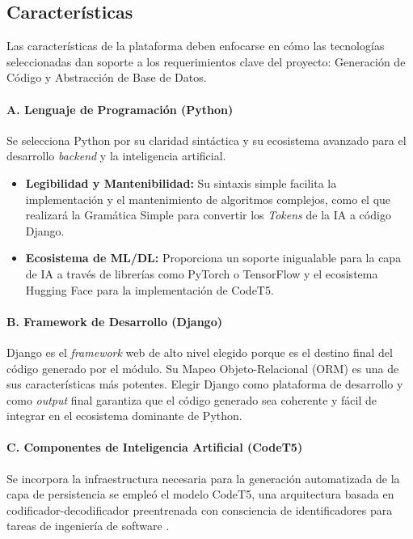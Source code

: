 \subsection{Características}
\label{subsubsec:plataforma-caracteristicas}

Las características de la plataforma deben enfocarse en cómo las tecnologías seleccionadas dan soporte a los requerimientos clave del proyecto: Generación de Código y Abstracción de Base de Datos.

\paragraph{A. Lenguaje de Programación (Python)}
Se selecciona Python por su claridad sintáctica y su ecosistema avanzado para el desarrollo \textit{backend} y la inteligencia artificial.

\begin{itemize}
    \item \textbf{Legibilidad y Mantenibilidad:} Su sintaxis simple facilita la implementación y el mantenimiento de algoritmos complejos, como el que realizará la Gramática Simple para convertir los \textit{Tokens} de la IA a código Django.
    \item \textbf{Ecosistema de ML/DL:} Proporciona un soporte inigualable para la capa de IA a través de librerías como PyTorch o TensorFlow y el ecosistema Hugging Face para la implementación de CodeT5.
\end{itemize}

\paragraph{B. Framework de Desarrollo (Django)}
Django es el \textit{framework} web de alto nivel elegido porque es el destino final del código generado por el módulo. Su Mapeo Objeto-Relacional (ORM) es una de sus características más potentes. Elegir Django como plataforma de desarrollo y como \textit{output} final garantiza que el código generado sea coherente y fácil de integrar en el ecosistema dominante de Python.

\paragraph{C. Componentes de Inteligencia Artificial (CodeT5)}
Se incorpora la infraestructura necesaria para la generación automatizada de la capa de persistencia se empleó el modelo CodeT5, una arquitectura basada en codificador-decodificador preentrenada con consciencia de identificadores para tareas de ingeniería de software \cite{wang2021codet5}.

